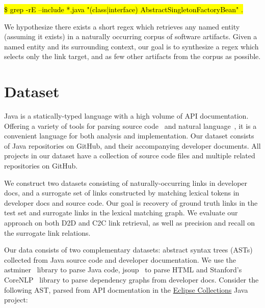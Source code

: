 \documentclass{article}
\newcommand*{\tinline}[1]{{\sethlcolor{slightgray}\ttfamily\footnotesize\relax\hl{#1}}}
\begin{document}
\centerline{\tinline{\$ grep -rE --include *.java "(class|interface) AbstractSingletonFactoryBean" .}}

We hypothesize there exists a short regex which retrieves any named entity (assuming it exists) in a naturally occurring corpus of software artifacts. Given a named entity and its surrounding context, our goal is to synthesize a regex which selects only the link target, and as few other artifacts from the corpus as possible.

\section{Dataset}

Java is a statically-typed language with a high volume of API documentation. Offering a variety of tools for parsing source code~\citep{parr2013definitive, hosseini2013javaparser, kovalenko2019pathminer} and natural language~\citep{manning2014stanford, grella2018non}, it is a convenient language for both analysis and implementation. Our dataset consists of Java repositories on GitHub, and their accompanying developer documents. All projects in our dataset have a collection of source code files and multiple related repositories on GitHub.

We construct two datasets consisting of naturally-occurring links in developer docs, and a surrogate set of links constructed by matching lexical tokens in developer docs and source code. Our goal is recovery of ground truth links in the test set and surrogate links in the lexical matching graph. We evaluate our approach on both D2D and C2C link retrieval, as well as precision and recall on the surrogate link relations.

Our data consists of two complementary datasets: abstract syntax trees (ASTs) collected from Java source code and developer documentation. We use the astminer~\citep{kovalenko2019pathminer} library to parse Java code, jsoup~\citep{hedley2009jsoup} to parse HTML and Stanford's CoreNLP~\citep{manning2014stanford} library to parse dependency graphs from developer docs. Consider the following AST, parsed from API docmentation in the \href{https://www.eclipse.org/collections/}{Eclipse Collections} Java project:

\vspace{20pt}

\begin{figure}[H]
    \centering
    
    \label{fig:ast}
\end{figure}
\end{document}
